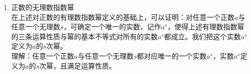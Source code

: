 \begin{enumerate}
\begin{enumerate}
\begin{enumerate}
                \item 偶次方根：当$n$为偶数的时候，\textbf{正数的$n$次方根有两个值，他们互为相反数}，$\sqrt[n]{a}$或者$+\sqrt[n]{a}$表示正的偶次方根，而$-\sqrt[n]{a}$表示负的偶次方根。两者可以合写为$\pm \sqrt[n]{a}$ 。例如：$\sqrt[4]{16} = 2, \pm \sqrt[2]{25} = \pm 5$。\textbf{负数没有偶次方根}。
                \item 特别指出：0的任意次方根都是0，即 $0 = \sqrt[n]{0}$
            \end{enumerate}
            \item 正数的有理数指数幂 \\
                首先考虑定义$a^{\frac{1}{n}}, n > 1, n \in \mathbf{Z}$。 根据$a = a^{1} = (a^{\frac{1}{n}})^n$，可以定义$a^{\frac{1}{n}} = \sqrt[n]{a}$ 。可以验证当$n=1$时定义依然成立。\\
                因此在保障三条运算性质成立的前提下，我们可以做如下定义：$a^{\frac{m}{n}} = \sqrt[n]{a^m}$, 其中$a > 0$, $m$为整数，$n$为正整数。可以验证，当$m,n$不互素的时候，$a^{\frac{m}{n}} = a^{\frac{m'}{n'}}$，其中$\dfrac{m}{n} = \dfrac{m'}{n'}$且$m',n'$互素。\\
                由此可以定义\textbf{正数的有理数指数幂}：$s = \dfrac{m}{n}$为有理数，定义$a^s = a^{\frac{m}{n}}$（$m,n$互素）。\\
                可以推导出开方和乘方的先后顺序不影响幂的值：即$a^{\frac{m}{n}} = \sqrt[n]{a^m} = (\sqrt[n]{a})^m$ \\
                推导如下：$\sqrt[n]{a^m} = (a^m)^{\frac{1}{n}} = (a^m)^{\frac{m}{m \cdot n}} = ((a^m)^{\frac{1}{m \cdot n}})^m = (a^\frac{1}{n})^m = (\sqrt[n]{a})^m$。\\
                正数的有理数指数幂具有性质(\textbf{幂的基本不等式})：$a^s > 1$， 其中$a > 1, s > 0, s \in \mathbf{Q}$ \\
                对于负数，由于负数没有偶次方根，因此对于一个负数$a$，并非所有的有理数$s$都可以使得$a^s$有意义。因此我们一般不考虑负数的有理指数幂。
        \end{enumerate}
    \item 正数的无理数指数幂 \\
        在上述对正数的有理数指数幂定义的基础上，可以证明：对任意一个正数$a$与任意一个无理数$s$，可确定一个唯一的实数，记作$a^s$，使得上述有理数指数幂的三条运算性质与幂的基本不等式对所有的实数$a^s$都成立。我们把这个实数$a^s$定义为$a$的$s$次幂。 \\
        理解：任意一个正数$a$与任意一个无理数$s$都对应唯一的一个实数$a^s$，实数$a^s$定义为$a$的$s$次幂，且满足运算性质。 \\

\end{enumerate}
